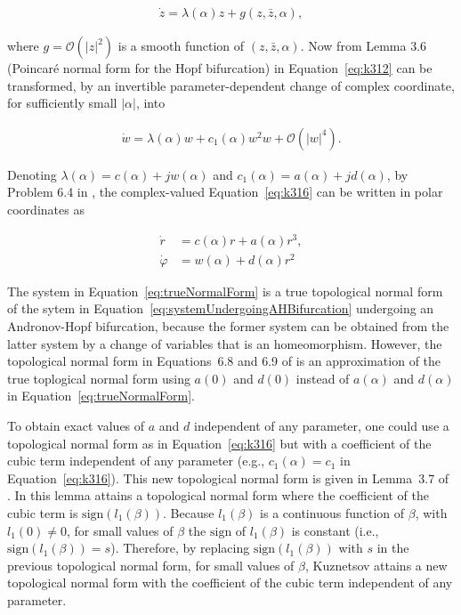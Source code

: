\documentclass{article}
\theoremstyle{lemma}
\begin{document}
\begin{align}
 \dot{z}=\lambda(\alpha)z+g(z,\bar{z},\alpha),
 \label{eq:k312}
\end{align}

\noindent where $g=\mathcal{O}(|z|^2)$ is a smooth function of
$(z,\bar{z},\alpha)$. Now from Lemma 3.6 (Poincar\'{e} normal form for the
Hopf bifurcation) in \citet{kuznetsov04} Equation~\ref{eq:k312} can be
transformed, by an invertible parameter-dependent change of complex
coordinate, for sufficiently small $|\alpha|$, into

\begin{align}
 \dot{w}=\lambda(\alpha)w+c_1(\alpha)w^2w+\mathcal{O}(|w|^4).
 \label{eq:k316}
\end{align}

Denoting $\lambda(\alpha)=c(\alpha)+jw(\alpha)$ and
$c_1(\alpha)=a(\alpha)+jd(\alpha)$, by Problem 6.4 in \citet{izhikevich07},
the complex-valued Equation~\ref{eq:k316} can be written in polar coordinates
as

\begin{equation}
 \begin{aligned}
  \dot{r}&=c(\alpha)r+a(\alpha)r^3,\\
  \dot{\varphi}&=w(\alpha)+d(\alpha)r^2
 \end{aligned}
 \label{eq:trueNormalForm}
\end{equation}

The system in Equation~\ref{eq:trueNormalForm} is a true topological normal
form of the sytem in Equation~\ref{eq:systemUndergoingAHBifurcation}
undergoing an Andronov-Hopf bifurcation, because the former system can be
obtained from the latter system by a change of variables that is an
homeomorphism. However, the topological normal form in Equations~6.8 and
6.9 of \citet{izhikevich07} is an approximation of the true toplogical
normal form using $a(0)$ and $d(0)$ instead of $a(\alpha)$ and $d(\alpha)$ in
Equation~\ref{eq:trueNormalForm}.

To obtain exact values of $a$ and $d$ independent of any parameter, one could
use a topological normal form as in Equation~\ref{eq:k316} but with a
coefficient of the cubic term independent of any parameter (e.g.,
$c_1(\alpha)=c_1$ in Equation~\ref{eq:k316}). This new topological normal form
is given in Lemma~3.7 of \citet{kuznetsov04}. In this lemma \citet{kuznetsov04}
attains a topological normal form where the coefficient of the cubic term is
$\textrm{sign}(l_1(\beta))$. Because $l_1(\beta)$ is a continuous function of
$\beta$, with $l_1(0)\neq 0$, for small values of $\beta$ the $\textrm{sign}$
of $l_1(\beta)$ is constant (i.e., $\textrm{sign}(l_1(\beta))=s$).  Therefore,
by replacing $\textrm{sign}(l_1(\beta))$ with $s$ in the previous topological
normal form, for small values of $\beta$, Kuznetsov attains a new topological
normal form with the coefficient of the cubic term independent of any
parameter.
\end{document}
